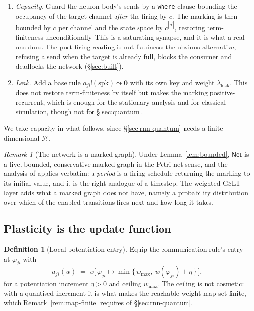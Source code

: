 \documentclass[11pt,a4paper]{article}
\theoremstyle{plain}
\theoremstyle{definition}
\newtheorem{definition}[theorem]{Definition}
\theoremstyle{remark}
\newtheorem{remark}[theorem]{Remark}
\newcommand{\Nil}{\mathbf{0}}
\newcommand{\wmap}{w}
\begin{document}
\begin{enumerate}[leftmargin=2.2em]
\item \emph{Capacity.} Guard the neuron body's sends by a \texttt{where} clause bounding the
occupancy of the target channel \emph{after} the firing by $c$. The marking is then bounded by $c$
per channel and the state space by $c^{|\vec a|}$, restoring term-finiteness unconditionally. This is
a saturating synapse, and it is what a real one does. The post-firing reading is not fussiness: the
obvious alternative, refusing a send when the target is already full, blocks the consumer and
deadlocks the network (\S\ref{sec:built}).
\item \emph{Leak.} Add a base rule $a_{ji}!(\mathrm{spk}) \leadsto \Nil$ with its own key and weight
$\lambda_{\text{leak}}$. This does not restore term-finiteness by itself but makes the marking
positive-recurrent, which is enough for the stationary analysis and for classical simulation, though
not for \S\ref{sec:quantum}.
\end{enumerate}

We take capacity in what follows, since \S\ref{sec:rnn-quantum} needs a finite-dimensional
$\mathcal{H}$.

\begin{remark}[The network is a marked graph]
Under Lemma~\ref{lem:bounded}, $\mathsf{Net}$ is a live, bounded, conservative marked graph in the
Petri-net sense, and the analysis of \cite{knots} applies verbatim: a \emph{period} is a firing
schedule returning the marking to its initial value, and it is the right analogue of a timestep. The
weighted-GSLT layer adds what a marked graph does not have, namely a probability distribution over
which of the enabled transitions fires next and how long it takes.
\end{remark}

\subsection{Plasticity is the update function}
\label{sec:plasticity}

\begin{definition}[Local potentiation entry]
\label{def:hebb}
Equip the communication rule's entry at $\varphi_{ji}$ with
\[
u_{ji}(\wmap) \;=\; \wmap\big[\,\varphi_{ji} \mapsto \min\{\,w_{\max},\ \wmap(\varphi_{ji}) + \eta\,\}\,\big],
\]
for a potentiation increment $\eta > 0$ and ceiling $w_{\max}$. The ceiling is not cosmetic: with a
quantised increment it is what makes the reachable weight-map set finite, which
Remark~\ref{rem:map-finite} requires of \S\ref{sec:rnn-quantum}.
\end{definition}
\end{document}
